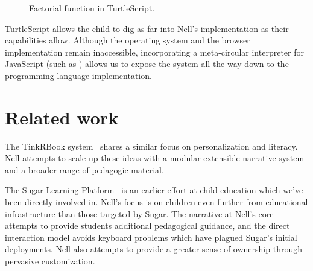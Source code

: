 \documentclass[preprint]{sig-alternate}
\begin{document}
\begin{figure}
\centering
{}
\caption{Factorial function in TurtleScript.}\label{fig:turtlescript}
\end{figure}

TurtleScript allows the child to dig as far into Nell's implementation
as their capabilities allow.  Although the operating system and the
browser implementation remain inaccessible, incorporating a
meta-circular interpreter for JavaScript (such as \cite{narcissus}) allows us
to expose the system all the way down to the programming
language implementation.


\section{Related work}\label{sec:related}

The TinkRBook system~\cite{chang:tinkrbook} shares a similar focus on
personalization and literacy.  Nell attempts to scale up these
ideas with a modular extensible narrative system and a broader range
of pedagogic material.

The Sugar Learning Platform~\cite{sugar} is an earlier effort at
child education which we've been directly involved in.  Nell's focus is
on children even further from educational infrastructure than those
targeted by Sugar.
The narrative at Nell's core attempts to provide students additional
pedagogical guidance, and the direct interaction model avoids keyboard
problems which have plagued Sugar's initial deployments.  Nell also
attempts to provide a greater sense of ownership through pervasive
customization.


\end{document}
